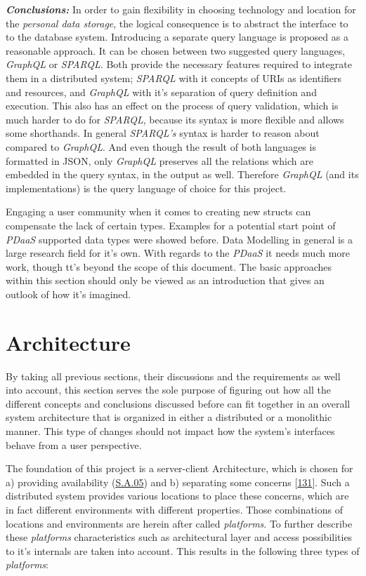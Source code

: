\documentclass[12pt,english,a4paper,titlepage,cleardoublepage=empty,dottedtoc]{report}
\begin{document}
\emph{\textbf{Conclusions:}} In order to gain flexibility in choosing
technology and location for the \emph{personal data storage}, the
logical consequence is to abstract the interface to to the database
system. Introducing a separate query language is proposed as a
reasonable approach. It can be chosen between two suggested query
languages, \emph{GraphQL} or \emph{SPARQL}. Both provide the necessary
features required to integrate them in a distributed system;
\emph{SPARQL} with it concepts of URIs as identifiers and resources, and
\emph{GraphQL} with it's separation of query definition and execution.
This also has an effect on the process of query validation, which is
much harder to do for \emph{SPARQL}, because its syntax is more flexible
and allows some shorthands. In general \emph{SPARQL's} syntax is harder
to reason about compared to \emph{GraphQL}. And even though the result
of both languages is formatted in JSON, only \emph{GraphQL} preserves
all the relations which are embedded in the query syntax, in the output
as well. Therefore \emph{GraphQL} (and its implementations) is the query
language of choice for this project.

Engaging a user community when it comes to creating new structs can
compensate the lack of certain types. Examples for a potential start
point of \emph{PDaaS} supported data types were showed before. Data
Modelling in general is a large research field for it's own. With
regards to the \emph{PDaaS} it needs much more work, though tt's beyond
the scope of this document. The basic approaches within this section
should only be viewed as an introduction that gives an outlook of how
it's imagined.

\section{Architecture}\label{architecture}

By taking all previous sections, their discussions and the requirements
as well into account, this section serves the sole purpose of figuring
out how all the different concepts and conclusions discussed before can
fit together in an overall system architecture that is organized in
either a distributed or a monolithic manner. This type of changes should
not impact how the system's interfaces behave from a user perspective.

The foundation of this project is a server-client Architecture, which is
chosen for a) providing availability (\protect\hyperlink{sa05}{S.A.05})
and b) separating some concerns
{[}\protect\hyperlink{ref-web_2016_wikipedia_separation-of-concerns}{131}{]}.
Such a distributed system provides various locations to place these
concerns, which are in fact different environments with different
properties. Those combinations of locations and environments are herein
after called \emph{platforms}. To further describe these
\emph{platforms} characteristics such as architectural layer and access
possibilities to it's internals are taken into account. This results in
the following three types of \emph{platforms}:
\end{document}
